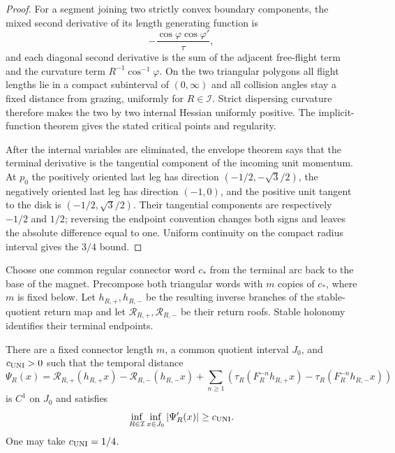 \begin{proof}
For a segment joining two strictly convex boundary components, the mixed
second derivative of its length generating function is
\[
 -\frac{\cos\varphi\cos\varphi'}{\tau},
\]
and each diagonal second derivative is the sum of the adjacent free-flight
term and the curvature term \(R^{-1}\cos^{-1}\varphi\).  On the two triangular
polygons all flight lengths lie in a compact subinterval of \((0,\infty)\)
and all collision angles stay a fixed distance from grazing, uniformly for
\(R\in\mathcal I\).  Strict dispersing curvature therefore makes the two by
two internal Hessian uniformly positive.  The implicit-function theorem gives
the stated critical points and regularity.

After the internal variables are eliminated, the envelope theorem says that
the terminal derivative is the tangential component of the incoming unit
momentum.  At \(p_0\) the positively oriented last leg has direction
\((-1/2,-\sqrt3/2)\), the negatively oriented last leg has direction
\((-1,0)\), and the positive unit tangent to the disk is
\((-1/2,\sqrt3/2)\).  Their tangential components are respectively
\(-1/2\) and \(1/2\); reversing the endpoint convention changes both signs
and leaves the absolute difference equal to one.  Uniform continuity on the
compact radius interval gives the \(3/4\) bound.
\end{proof}

Choose one common regular connector word \(c_*\) from the terminal arc back to
the base of the magnet.  Precompose both triangular words with \(m\) copies of
\(c_*\), where \(m\) is fixed below.  Let \(h_{R,+},h_{R,-}\) be the resulting
inverse branches of the stable-quotient return map and let
\(\mathcal R_{R,+},\mathcal R_{R,-}\) be their return roofs.  Stable holonomy
identifies their terminal endpoints.

\begin{lemma}
\label{lem:r3-a2-uni}
There are a fixed connector length \(m\), a common quotient interval \(J_0\),
and \(c_{\rm UNI}>0\) such that the temporal distance
\[
 \Psi_R(x)=\mathcal R_{R,+}(h_{R,+}x)
 -\mathcal R_{R,-}(h_{R,-}x)
 +\sum_{n\ge1}
 \left(\tau_R(F_R^{-n}h_{R,+}x)-
       \tau_R(F_R^{-n}h_{R,-}x)\right)
\]
is \(C^1\) on \(J_0\) and satisfies
\[
 \inf_{R\in\mathcal I}\inf_{x\in J_0}|\Psi_R'(x)|
 \ge c_{\rm UNI}.
\]
One may take \(c_{\rm UNI}=1/4\).
\end{lemma}

